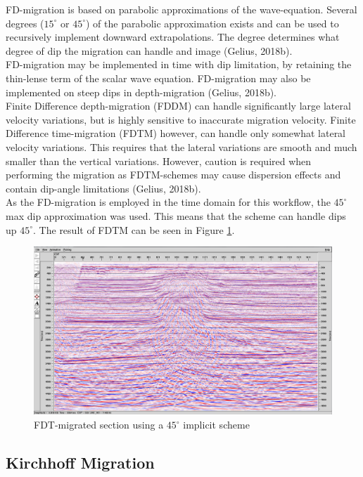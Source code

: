 \documentclass[10pt,a4paper]{article}
\begin{document}
\noindent FD-migration is based on parabolic approximations of the wave-equation. Several degrees ($15^{\circ}$ or $45^{\circ}$) of the parabolic approximation exists and can be used to recursively implement downward extrapolations. The degree determines what degree of dip the migration can handle and image (Gelius, 2018b).
\\
FD-migration may be implemented in time with dip limitation, by retaining the thin-lense term of the scalar wave equation. FD-migration may also be implemented on steep dips in depth-migration (Gelius, 2018b).
\\
Finite Difference depth-migration (FDDM) can handle significantly large lateral velocity variations, but is highly sensitive to inaccurate migration velocity. Finite Difference time-migration (FDTM) however, can handle only somewhat lateral velocity variations. This requires that the lateral variations are smooth and much smaller than the vertical variations. However, caution is required when performing the migration as FDTM-schemes may cause dispersion effects and contain dip-angle limitations (Gelius, 2018b). 
\\
As the FD-migration is employed in the time domain for this workflow, the $45^{\circ}$ max dip approximation was used. This means that the scheme can handle dips up $45^{\circ}$. The result of FDTM can be seen in Figure \ref{FDTM}.

\begin{figure}[H]
\includegraphics[width=\textwidth]{FDmed3aforkirchh.jpg}
\caption{FDT-migrated section using a $45^{\circ}$ implicit scheme}
\label{FDTM}
\end{figure}

\subsection{Kirchhoff Migration}
\end{document}
